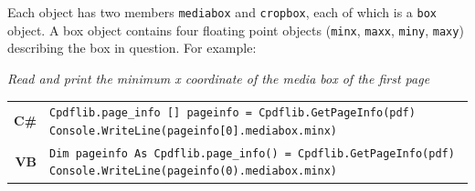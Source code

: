\documentclass[a4paper]{memoir}
\begin{document}
Each object has two members \verb!mediabox! and \verb!cropbox!, each of which is a \verb!box! object. A box object contains four floating point objects (\verb!minx!, \verb!maxx!, \verb!miny!, \verb!maxy!) describing the box in question. For example:

\begin{framed}
\noindent\textit{Read and print the minimum x coordinate of the media box of the first page}

\vspace{2mm}
\noindent\begin{tabular}{rl}
\small\sffamily\textbf{C\#} &
\begin{minipage}{4in}
\small\verb!Cpdflib.page_info [] pageinfo = Cpdflib.GetPageInfo(pdf)!
\small\verb!Console.WriteLine(pageinfo[0].mediabox.minx)!
\end{minipage}\\[5mm]
\small\sffamily\textbf{VB} &
\begin{minipage}{4in}
\small\verb!Dim pageinfo As Cpdflib.page_info() = Cpdflib.GetPageInfo(pdf)!
\small\verb!Console.WriteLine(pageinfo(0).mediabox.minx)!
\end{minipage}\\[5mm]
\end{tabular}
\end{framed}
\end{document}
